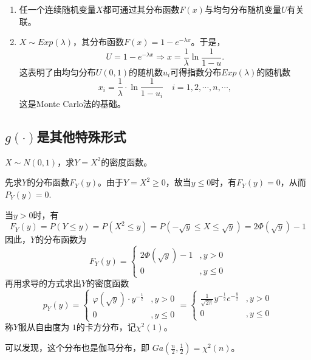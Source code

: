  \begin{remark}
 \begin{enumerate}
     \item  任一个连续随机变量$X$都可通过其分布函数$F(x)$与均匀分布随机变量$U$有关联。
     \item $X\sim {Exp}(\lambda)$，其分布函数$F(x)=1-e^{-\lambda x}$。于是，
     $$U=1-e^{-\lambda x} \Rightarrow x=\frac{1}{\lambda} \ln \frac{1}{1-u}.$$
     这表明了由均匀分布$U(0,1)$的随机数$u_{i}$可得指数分布${Exp}(\lambda)$的随机数$$x_{i}=\frac{1}{\lambda} \cdot \ln \frac{1}{1-u_{i}} \quad i=1,2, \cdots, n, \cdots,$$
     这是Monte Carlo法的基础。
 \end{enumerate}
\end{remark}
    
\subsection{$g(\cdot)$是其他特殊形式}
\begin{example}
    $X\sim N(0,1)$，求$Y=X^{2}$的密度函数。
\end{example}
\begin{solution}
    先求$Y$的分布函数$F_{Y}(y)$。由于$Y=X^{2}\ge 0$，故当$y\leq 0$时，有$F_{Y}(y)=0$，从而$P_{Y}(y)=0$.
   
    当$y>0$时，有$$F_{Y}(y)=P(Y \leqslant y)=P\left(X^{2} \leqslant y\right)=P(-\sqrt{y} \leqslant X \leqslant \sqrt{y})=2 \Phi(\sqrt{y})-1$$
    因此，$Y$的分布函数为
    $$F_{Y}(y)=\left\{\begin{array}{cc}
    2 \Phi(\sqrt{y})-1 & ,y>0 \\
    0 & , y \leq 0
    \end{array}\right.$$
    再用求导的方式求出$Y$的密度函数
    $$p_{Y}(y)=\left\{\begin{array}{cc}
    \varphi(\sqrt{y}) \cdot y^{-\frac{1}{2}} & ,y>0 \\
    0 & , y \leqslant 0
    \end{array}=\left\{\begin{array}{cc}
    \frac{1}{\sqrt{2 \pi}} y^{-\frac{1}{2}} e^{-\frac{y}{2}} & ,y>0 \\
    0 & ,y \leqslant 0
    \end{array}\right.\right.$$
    称$Y$服从自由度为 $1$的卡方分布，记$\chi ^{2}(1)$。
\end{solution}
\begin{remark}
   可以发现，这个分布也是伽马分布，即 $Ga(\frac{n}{2},\frac{1}{2})=\chi ^{2}(n)$。
    \end{remark}
